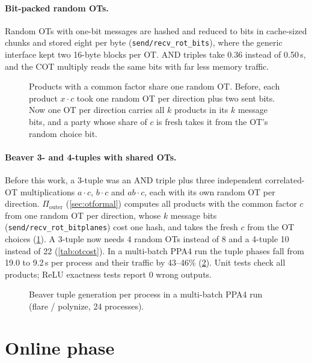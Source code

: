\documentclass[10pt,a4paper]{article}
\newcommand{\s}{\,s\xspace}
\begin{document}
\paragraph{Bit-packed random OTs.} Random OTs with one-bit messages are hashed and reduced to bits in
cache-sized chunks and stored eight per byte (\texttt{send/recv\_rot\_bits}), where the generic
interface kept two 16-byte blocks per OT. AND triples take 0.36 instead of 0.50\s, and the COT multiply
reads the same bits with far less memory traffic.

\begin{figure}[t]
  \centering
  \caption{Products with a common factor share one random OT. Before, each product $x\cdot c$ took one
  random OT per direction plus two sent bits. Now one OT per direction carries all $k$ products in its $k$
  message bits, and a party whose share of $c$ is fresh takes it from the OT's random choice bit.}
  \label{fig:outer}
\end{figure}

\paragraph{Beaver 3- and 4-tuples with shared OTs.} Before this work, a 3-tuple was an AND triple plus three
independent correlated-OT multiplications $a\cdot c$, $b\cdot c$ and $ab\cdot c$, each with its own random OT per
direction. $\Pi_{\mathrm{outer}}$ (\cref{sec:otformal}) computes all products with the common factor $c$ from one
random OT per direction, whose $k$ message bits (\texttt{send/recv\_rot\_bitplanes}) cost one hash, and takes the
fresh $c$ from the OT choices (\cref{fig:outer}). A 3-tuple now needs 4 random OTs instead of 8 and a 4-tuple 10
instead of 22 (\cref{tab:otcost}). In a multi-batch PPA4 run the tuple phases fall from 19.0 to 9.2\s per process
and their traffic by 43--46\% (\cref{fig:tuples}). Unit tests check all products; ReLU exactness tests report 0 wrong
outputs.

\begin{figure}[t]
  \centering
  \caption{Beaver tuple generation per process in a multi-batch PPA4 run (flare / polynize, 24 processes).}
  \label{fig:tuples}
\end{figure}

\section{Online phase}\label{sec:online}
\end{document}
